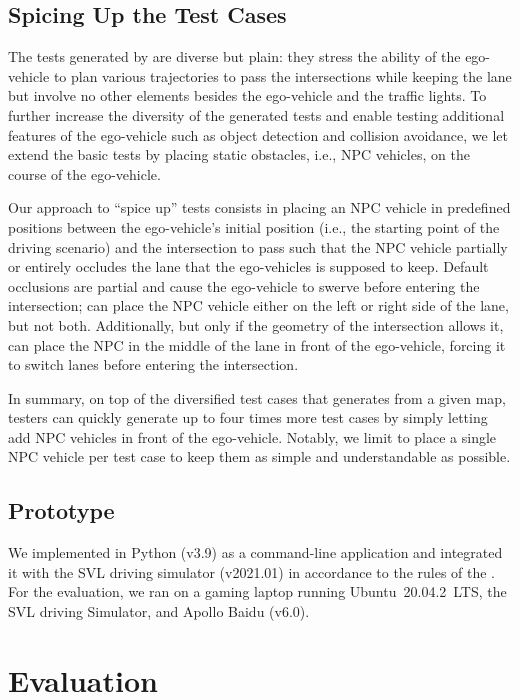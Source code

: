 \documentclass[conference]{IEEEtran}
\begin{document}
\subsection{Spicing Up the Test Cases}
\label{sec:spicing-up}
The tests generated by \tool are diverse but plain: they stress the ability of the ego-vehicle to plan various trajectories to pass the intersections while keeping the lane but involve no other elements besides the ego-vehicle and the traffic lights. To further increase the diversity of the generated tests and enable testing additional features of the ego-vehicle such as object detection and collision avoidance, we let \tool extend the basic tests by placing static obstacles, i.e., NPC vehicles, on the course of the ego-vehicle.

Our approach to ``spice up'' tests consists in placing an NPC vehicle in predefined positions between the ego-vehicle's initial position (i.e., the starting point of the driving scenario) and the intersection to pass such that the NPC vehicle partially or entirely occludes the lane that the ego-vehicles is supposed to keep. Default occlusions are partial and cause the ego-vehicle to swerve before entering the intersection; \tool can place the NPC vehicle either on the left or right side of the lane, but not both. Additionally, but only if the geometry of the intersection allows it, \tool can place the NPC in the middle of the lane in front of the ego-vehicle, forcing it to switch lanes before entering the intersection.

In summary, on top of the diversified test cases that \tool generates from a given map, testers can quickly generate up to four times more test cases by simply letting \tool add NPC vehicles in front of the ego-vehicle. Notably, we limit \tool to place a single NPC vehicle per test case to keep them as simple and understandable as possible.

\subsection{Prototype}
We implemented \tool in Python (v3.9) as a command-line application and integrated it with the SVL driving simulator (v2021.01) in accordance to the rules of the \challenge.
For the evaluation, we ran \tool on a gaming laptop running Ubuntu~20.04.2~LTS, the SVL driving Simulator, and Apollo Baidu (v6.0).

\section{Evaluation}
\label{sec:evaluation}
\end{document}
